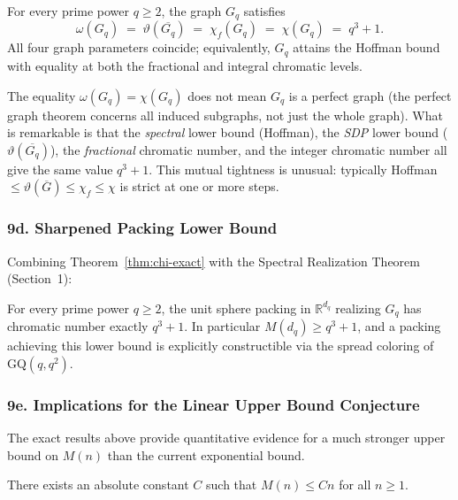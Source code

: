 \begin{corollary}\label{cor:theta-perfect}
For every prime power $q\ge 2$, the graph $G_q$ satisfies
\[
  \omega(G_q) \;=\; \vartheta(\overline{G_q}) \;=\; \chi_f(G_q) \;=\; \chi(G_q) \;=\; q^3+1.
\]
All four graph parameters coincide; equivalently, $G_q$ attains the Hoffman bound with equality at both the fractional and integral chromatic levels.
\end{corollary}

\begin{remark}
The equality $\omega(G_q)=\chi(G_q)$ does not mean $G_q$ is a perfect graph (the perfect graph theorem concerns all induced subgraphs, not just the whole graph).  What is remarkable is that the \emph{spectral} lower bound (Hoffman), the \emph{SDP} lower bound ($\vartheta(\overline{G_q})$), the \emph{fractional} chromatic number, and the integer chromatic number all give the same value $q^3+1$.  This mutual tightness is unusual: typically Hoffman $\le\vartheta(\overline{G})\le\chi_f\le\chi$ is strict at one or more steps.
\end{remark}

\subsubsection*{9d. Sharpened Packing Lower Bound}

Combining Theorem~\ref{thm:chi-exact} with the Spectral Realization Theorem (Section~1):

\begin{corollary}\label{cor:sharp-lower}
For every prime power $q\ge 2$, the unit sphere packing in $\mathbb{R}^{d_q}$ realizing $G_q$ has chromatic number exactly $q^3+1$.  In particular $M(d_q)\ge q^3+1$, and a packing achieving this lower bound is explicitly constructible via the spread coloring of $\mathrm{GQ}(q,q^2)$.
\end{corollary}

\subsubsection*{9e. Implications for the Linear Upper Bound Conjecture}

The exact results above provide quantitative evidence for a much stronger upper bound on $M(n)$ than the current exponential bound.

\begin{conjecture}\label{conj:linear}
There exists an absolute constant $C$ such that $M(n)\le Cn$ for all $n\ge 1$.
\end{conjecture}

